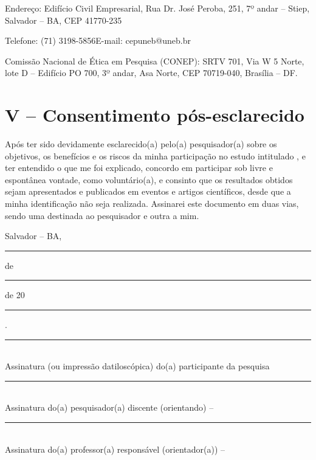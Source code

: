 \noindent Endereço: Edifício Civil Empresarial, Rua Dr. José Peroba, 251, 7º andar -- Stiep, Salvador -- BA, CEP 41770-235

\noindent Telefone: (71) 3198-5856\hspace{0.8cm}E-mail: cepuneb@uneb.br

\noindent Comissão Nacional de Ética em Pesquisa (CONEP): SRTV 701, Via W 5 Norte, lote D -- Edifício PO 700, 3º andar, Asa Norte, CEP 70719-040, Brasília -- DF.

\section{V -- Consentimento pós-esclarecido}

Após ter sido devidamente esclarecido(a) pelo(a) pesquisador(a) sobre os objetivos, os benefícios e os riscos da minha participação no estudo intitulado \imprimirtitulo, e ter entendido o que me foi explicado, concordo em participar sob livre e espontânea vontade, como voluntário(a), e consinto que os resultados obtidos sejam apresentados e publicados em eventos e artigos científicos, desde que a minha identificação não seja realizada. Assinarei este documento em duas vias, sendo uma destinada ao pesquisador e outra a mim.

\vspace{0.8cm}

\noindent Salvador -- BA, \rule{2cm}{0.4pt} de \rule{3cm}{0.4pt} de 20\rule{1cm}{0.4pt}.

\vspace{1.5cm}

\noindent\rule{9cm}{0.4pt}\\
Assinatura (ou impressão datiloscópica) do(a) participante da pesquisa

\vspace{1.5cm}

\noindent\rule{9cm}{0.4pt}\\
Assinatura do(a) pesquisador(a) discente (orientando) -- \imprimirautor

\vspace{1.5cm}

\noindent\rule{9cm}{0.4pt}\\
Assinatura do(a) professor(a) responsável (orientador(a)) -- \imprimirorientador

